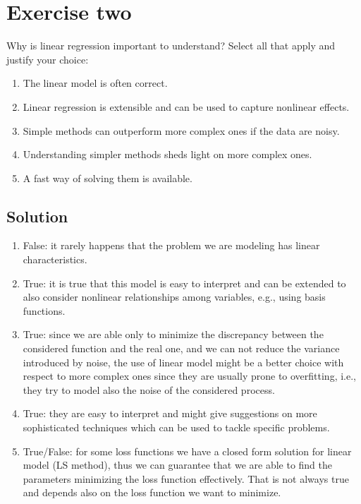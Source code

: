\section{Exercise two}

Why is linear regression important to understand? 
Select all that apply and justify your choice:
\begin{enumerate}
    \item The linear model is often correct.
    \item Linear regression is extensible and can be used to capture nonlinear effects.
    \item Simple methods can outperform more complex ones if the data are noisy.
    \item Understanding simpler methods sheds light on more complex ones.
    \item A fast way of solving them is available.
\end{enumerate}

\subsection{Solution}
\begin{enumerate}
    \item False: it rarely happens that the problem we are modeling has linear characteristics.
    \item True: it is true that this model is easy to interpret and can be extended to also consider nonlinear relationships among variables, e.g., using basis functions.
    \item True: since we are able only to minimize the discrepancy between the considered function and the real one, and we can not reduce the variance introduced by noise, the use of linear model might be a better choice with respect to more complex ones since they are usually prone to overfitting, i.e., they try to model also the noise of the considered process.
    \item True: they are easy to interpret and might give suggestions on more sophisticated techniques which can be used to tackle specific problems.
    \item True/False: for some loss functions we have a closed form solution for linear model (LS method), thus we can guarantee that we are able to find the parameters minimizing the loss function effectively. 
        That is not always true and depends also on the loss function we want to minimize.
\end{enumerate}